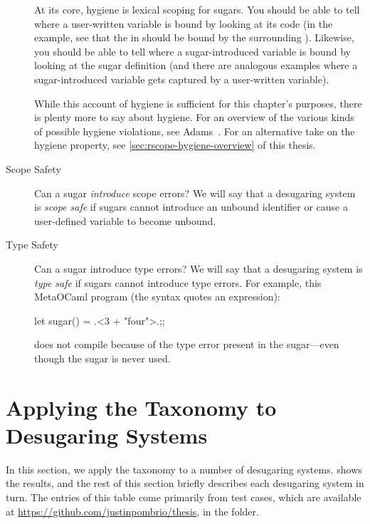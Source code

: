 \begin{description}
    At its core, hygiene is lexical scoping for sugars. You should be
    able to tell where a user-written variable is bound by looking at
    its code (in the example, see that the  in  should be bound by the surrounding ).
    Likewise,
    you should be able to tell where a sugar-introduced variable is
    bound by looking at the sugar definition (and there are analogous
    examples where a sugar-introduced variable gets captured by a
    user-written variable).

    While this account of hygiene is sufficient for this chapter's
    purposes, there is plenty more to say about hygiene. For an
    overview of the various kinds of possible hygiene violations, see
    Adams~\cite{adams-hygiene}. For an alternative take on the hygiene
    property, see \cref{sec:rscope-hygiene-overview} of this thesis.
    
  \item[Scope Safety] Can a sugar \emph{introduce} scope errors?  We
    will say that a desugaring system is \emph{scope safe} if sugars
    cannot introduce an unbound identifier or cause a user-defined
    variable to become unbound.

  \item[Type Safety] Can a sugar introduce type errors? We will say
    that a desugaring system is \emph{type safe} if sugars cannot
    introduce type errors. For example, this MetaOCaml program (the
     syntax quotes an expression):
\begin{CorrectlyIndentedCodes}
let sugar() = .<3 + "four">.;;
\end{CorrectlyIndentedCodes}
    does not compile because of the type error present in the
    sugar---even though the sugar is never used.
\end{description}

\section{Applying the Taxonomy to Desugaring Systems}\label{sec:taxonomy-systems}

In this section, we apply the taxonomy to a number of desugaring
systems.
 shows the results, and the rest
of this section briefly describes each desugaring system in turn. The
entries of this table come primarily from test cases, which are
available at \url{https://github.com/justinpombrio/thesis}, in the
 folder.

